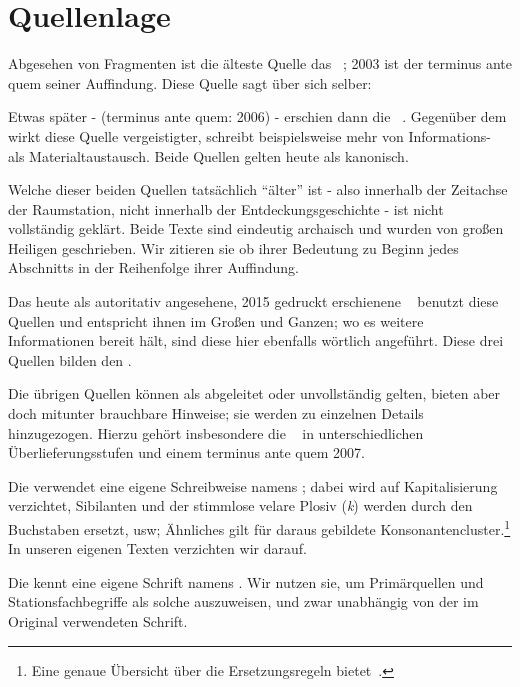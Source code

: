 \section*{Quellenlage}

Abgesehen von Fragmenten ist die älteste Quelle das ~\cite{cbasestarbasemanual}; 2003 ist der terminus ante quem seiner Auffindung. Diese Quelle sagt über sich selber:

Etwas später - (terminus ante quem: 2006) - erschien dann die ~\cite{ctour}. Gegenüber dem  wirkt diese Quelle vergeistigter, schreibt beispielsweise mehr von Informations- als Materialtaustausch. Beide Quellen gelten heute als kanonisch.

Welche dieser beiden Quellen tatsächlich "`älter"' ist - also innerhalb der Zeitachse der Raumstation, nicht innerhalb der Entdeckungsgeschichte - ist nicht vollständig geklärt. 
Beide Texte sind eindeutig archaisch und wurden von großen Heiligen geschrieben.  Wir zitieren sie ob ihrer Bedeutung zu Beginn jedes Abschnitts in der Reihenfolge ihrer Auffindung.

Das heute als autoritativ angesehene, 2015 gedruckt erschienene ~\cite{cbasebook} benutzt diese Quellen und entspricht ihnen im Großen und Ganzen; wo es weitere Informationen bereit hält, sind diese hier ebenfalls wörtlich angeführt. Diese drei Quellen bilden den .

Die übrigen Quellen können als abgeleitet oder unvollständig gelten, bieten aber doch mitunter brauchbare Hinweise; sie werden zu einzelnen Details hinzugezogen. Hierzu gehört  insbesondere die ~\cite{cbasepressemap} in unterschiedlichen Überlieferungsstufen und einem terminus ante quem 2007. 

Die  verwendet eine eigene Schreibweise namens  ; dabei wird auf Kapitalisierung verzichtet,  Sibilanten und der stimmlose velare Plosiv (\emph{k}) werden durch den Buchstaben  ersetzt, usw; Ähnliches gilt für daraus gebildete Konsonantencluster.\footnote{Eine genaue Übersicht über die Ersetzungsregeln bietet~\cite[S.~46]{cbasebook}.} In unseren eigenen Texten verzichten wir darauf.

Die  kennt eine eigene Schrift namens . Wir nutzen sie, um Primärquellen und Stationsfachbegriffe als solche auszuweisen, und zwar unabhängig von der im Original verwendeten Schrift. 

